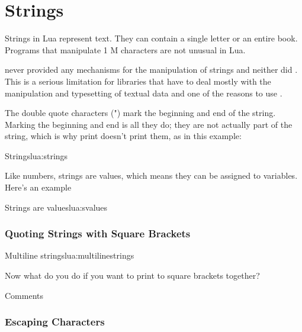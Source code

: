 \chapter{Strings}

Strings in Lua represent text. They can contain a single letter or an entire book. Programs that manipulate 1 M characters are not unusual in Lua. \cite{roberto}

\tex never provided any mechanisms for the manipulation of strings and neither did \latex. This is a serious limitation for libraries that have to deal mostly with the manipulation and typesetting of textual data and one of the reasons to use \LUA. 

The double quote characters (") mark the beginning and end of the string. Marking the beginning and
end is all they do; they are not actually part of the string, which is why print doesn't print them, as in
this example:

\begin{texexample}{Strings}{lua:strings}
\end{texexample}

Like numbers, strings are values, which means they can be assigned to variables. Here's an example

\begin{texexample}{Strings are values}{lua:svalues}
\end{texexample}

\subsection{Quoting Strings with Square Brackets}

\begin{texexample}{Multiline strings}{lua:multilinestrings}
\end{texexample}

Now what do you do if you want to print to square brackets together?

\begin{texexample}{Comments}{}
\ttfamily {}
\end{texexample}

\subsection{Escaping Characters}

